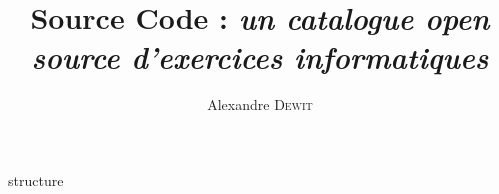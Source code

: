 \documentclass{EPL-master-thesis-covers-FR}
\title{ Source Code : \textit{un catalogue open source d'exercices informatiques}}
\author{Alexandre \textsc{Dewit}}
\begin{document}
  \maketitle
  
  {structure}

  \backcoverpage
\end{document}
